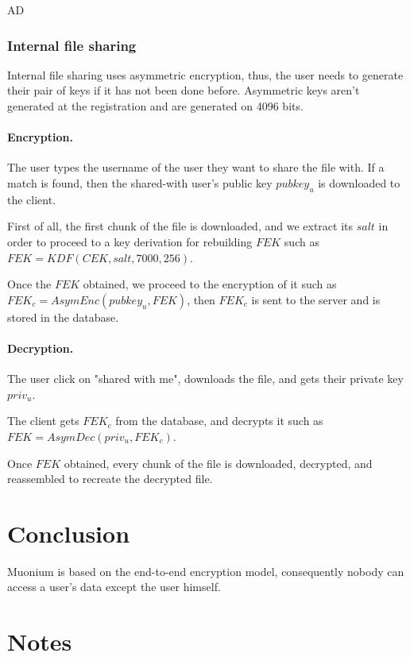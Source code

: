AD\documentclass[a4paper,10pt]{article}
\begin{document}
\subsubsection{Internal file sharing}

Internal file sharing uses asymmetric encryption, thus, the user needs to generate their pair of
keys if it has not been done before. Asymmetric keys aren't generated at the registration and
are generated on 4096 bits.

\paragraph{Encryption.}

The user types the username of the user they want to share the file with. If a match is found, then the
shared-with user's public key $pubkey_u$ is downloaded to the client.

First of all, the first chunk of the file is downloaded, and we extract its $salt$ in order to proceed
to a key derivation for rebuilding $FEK$ such as $FEK=KDF(CEK, salt, 7000, 256)$.

Once the $FEK$ obtained, we proceed to the encryption of it such as $FEK_c=AsymEnc(pubkey_u, FEK)$, then
$FEK_c$ is sent to the server and is stored in the database.

\paragraph{Decryption.}

The user click on "shared with me", downloads the file, and gets their private key $priv_u$.

The client gets $FEK_c$ from the database, and decrypts it such as $FEK=AsymDec(priv_u, FEK_c)$.

Once $FEK$ obtained, every chunk of the file is downloaded, decrypted, and reassembled to recreate the
decrypted file.

\section{Conclusion}
Muonium is based on the end-to-end encryption model, consequently nobody can access a user's data except the user himself.

\section{Notes}
\end{document}
